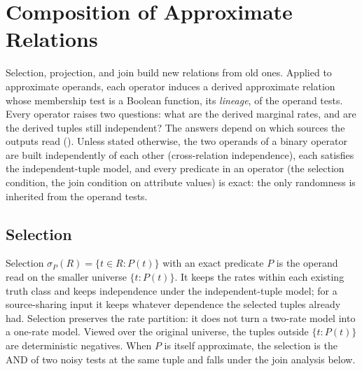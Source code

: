 %

\section{Composition of Approximate Relations}
\label{sec:relation-composition}

Selection, projection, and join build new relations from old ones. Applied to
approximate operands, each operator induces a derived approximate relation whose
membership test is a Boolean function, its \emph{lineage}, of the operand tests. Every operator raises two questions: what
are the derived marginal rates, and are the derived tuples still independent? The
answers depend on which sources the outputs read
(). Unless stated otherwise, the two operands of a binary
operator are built independently of each other (cross-relation independence),
each satisfies the independent-tuple model, and every predicate in an operator
(the selection condition, the join condition on attribute values) is exact: the
only randomness is inherited from the operand tests.

\subsection*{Selection}

Selection $\sigma_P(R) = \{t \in R : P(t)\}$ with an exact
predicate $P$ is the operand read on the smaller universe $\{t : P(t)\}$. It
keeps the rates within each existing truth class and keeps independence under the
independent-tuple model; for a source-sharing input it keeps whatever dependence
the selected tuples already had. Selection preserves the rate partition: it does
not turn a two-rate model into a one-rate model. Viewed over the original
universe, the tuples outside $\{t : P(t)\}$ are deterministic negatives. When $P$
is itself approximate, the selection is the AND of two noisy tests at the same
tuple and falls under the join analysis below.

